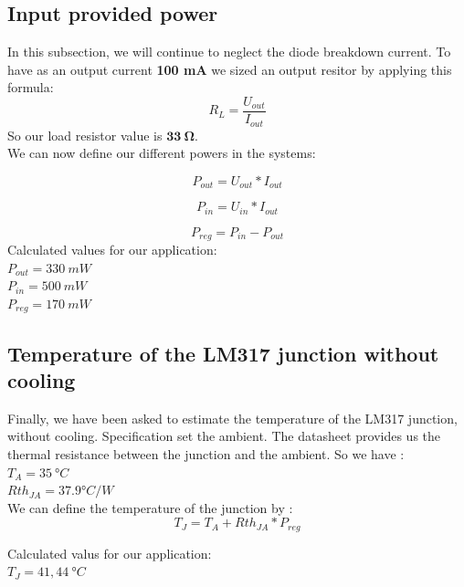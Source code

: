 \subsection{Input provided power} \label{ssec:num03}
{
In this subsection, we will continue to neglect the diode breakdown current. To have as an output current \textbf{100 mA} we sized an output resitor by applying this formula:
\begin{equation}
    R_L = \frac{U_{out}}{I_{out}}
\end{equation}
So our load resistor value is $ \mathbf{ 33 \ \boldsymbol{\Omega} } $. \\
\clearpage
We can now define our different powers in the systems:

\begin{equation}
    P_{out} = U_{out}*I_{out}
\end{equation}

\begin{equation}
    P_{in} = U_{in}*I_{out}
\end{equation}

\begin{equation}
    P_{reg} = P_{in} - P_{out}
\end{equation}
Calculated values for our application:\\
$ P_{out} = 330 \ mW $ \\
$ P_{in}  = 500 \ mW $ \\
$ P_{reg} = 170 \ mW $ \\
}

\subsection{Temperature of the LM317 junction without cooling} \label{ssec:num05}
{
Finally, we have been asked to estimate the temperature of the LM317 junction, without cooling. Specification set the ambient. The datasheet provides us the thermal resistance between the junction and the ambient. So we have : \\
$ T_{A} = 35 \ °C $ \\
$ Rth_{JA} = 37.9 °C/W $\\
We can define the temperature of the junction by :
\begin{equation*}
	T_{J} = T_{A} + Rth_{JA} * P_{reg}
\end{equation*}

Calculated valus for our application:\\
$ T_{J} = 41,44 \ °C $ \\

}

